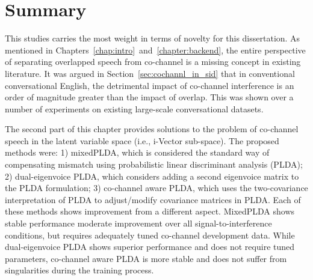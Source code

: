 \section{Summary}
\label{sec:ch3_summary}
This studies carries the most weight in terms of novelty for this dissertation. 
As mentioned in Chapters~\ref{chap:intro}~and~\ref{chapter:backend}, the entire perspective of separating overlapped speech from co-channel is a missing concept in existing literature. 
It was argued in Section~\ref{sec:cochannl_in_sid} that in conventional conversational English, the detrimental impact of co-channel interference is an order of magnitude greater than the impact of overlap. 
This was shown over a number of experiments on existing large-scale conversational datasets. 

The second part of this chapter provides solutions to the problem of co-channel speech in the latent variable space (i.e., i-Vector sub-space). 
The proposed methods were: 1) mixedPLDA, which is considered the standard way of compensating mismatch using probabilistic linear discriminant analysis (PLDA); 2) dual-eigenvoice PLDA, which considers adding a second eigenvoice matrix to the PLDA formulation; 3) co-channel aware PLDA, which uses the two-covariance interpretation of PLDA to adjust/modify covariance matrices in PLDA. 
Each of these methods shows improvement from a different aspect. 
MixedPLDA shows stable performance moderate improvement over all signal-to-interference conditions, but requires adequately tuned co-channel development data. 
While dual-eigenvoice PLDA shows superior performance and does not require tuned parameters, co-channel aware PLDA is more stable and does not suffer from singularities during the training process. 



